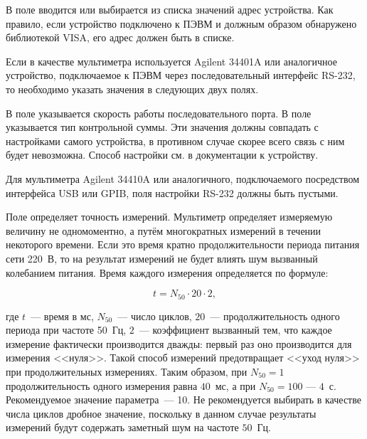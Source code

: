 В поле  вводится или выбирается из списка значений адрес устройства. Как правило, если устройство подключено к ПЭВМ и должным образом обнаружено библиотекой VISA, его адрес должен быть в списке.

Если в качестве мультиметра используется Agilent 34401A или аналогичное устройство, подключаемое к ПЭВМ через последовательный интерфейс RS-232, то необходимо указать значения в следующих двух полях.

В поле  указывается скорость работы последовательного порта. В поле  указывается тип контрольной суммы. Эти значения должны совпадать с настройками самого устройства, в противном случае скорее всего связь с ним будет невозможна. Способ настройки см. в документации к устройству.


Для мультиметра Agilent 34410A или аналогичного, подключаемого посредством интерфейса USB или GPIB, поля настройки RS-232 должны быть пустыми.

Поле  определяет точность измерений. Мультиметр определяет измеряемую величину не одномоментно, а путём многократных измерений в течении некоторого времени. Если это время кратно продолжительности периода питания сети 220~В, то на результат измерений не будет влиять шум вызванный колебанием питания. Время каждого измерения определяется по формуле:

\begin{equation}
t = N_{50} \cdot 20 \cdot 2,
\end{equation}

\noindent где $t$~--- время в мс, $N_{50}$~--- число циклов, $20$~--- продолжительность одного периода при частоте 50~Гц, $2$~--- коэффициент вызванный тем, что каждое измерение фактически производится дважды: первый раз оно производится для измерения <<нуля>>. Такой способ измерений предотвращает <<уход нуля>> при продолжительных измерениях. Таким образом, при $N_{50} = 1$ продолжительность одного измерения равна $40$~мс, а при $N_{50} = 100$ --- $4$~с. Рекомендуемое значение параметра~--- 10. Не рекомендуется выбирать в качестве числа циклов дробное значение, поскольку в данном случае результаты измерений будут содержать заметный шум на частоте $50$~Гц.
